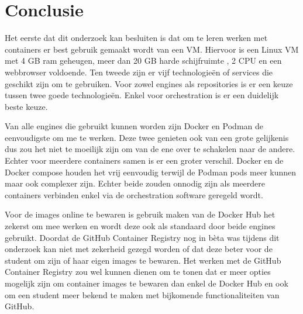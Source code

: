 
\chapter{Conclusie}
\label{ch:conclusie}

Het eerste dat dit onderzoek kan besluiten is dat om te leren werken met containers er best gebruik gemaakt wordt van een VM. Hiervoor is een Linux VM met 4 GB ram geheugen, meer dan 20 GB harde schijfruimte , 2 CPU en een webbrowser voldoende. Ten tweede zijn er vijf technologieën of services die geschikt zijn om te gebruiken. Voor zowel engines als repositories is er een keuze tussen twee goede technologieën. Enkel voor orchestration is er een duidelijk beste keuze. 

Van alle engines die gebruikt kunnen worden zijn Docker en Podman de eenvoudigste om me te werken. Deze twee genieten ook van een grote gelijkenis dus zou het niet te moeilijk zijn om van de ene over te schakelen naar de andere. Echter voor meerdere containers samen is er een groter verschil. Docker en de Docker compose houden het vrij eenvoudig terwijl de Podman pods meer kunnen maar ook complexer zijn. Echter beide zouden onnodig zijn als meerdere containers verbinden enkel via de orchestration software geregeld wordt.

Voor de images online te bewaren is gebruik maken van de Docker Hub het zekerst om mee werken en wordt deze ook als standaard door beide engines gebruikt. Doordat de GitHub Container Registry nog in bèta was tijdens dit onderzoek kan niet met zekerheid gezegd worden of dat deze beter voor de student om zijn of haar eigen images te bewaren. Het werken met de GitHub Container Registry zou wel kunnen dienen om te tonen dat er meer opties mogelijk zijn om container images te bewaren dan enkel de Docker Hub en ook om een student meer bekend te maken met bijkomende functionaliteiten van GitHub. 

